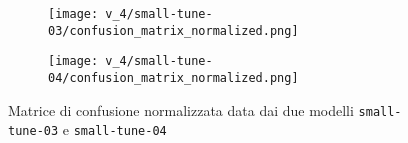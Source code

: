     \begin{figure}[!htb]
        \centering
        \begin{subfigure}{.49\textwidth}
            \texttt{[image: v\_4/small-tune-03/confusion\_matrix\_normalized.png]}
            \label{fig:v4-4.1}
        \end{subfigure}
        \begin{subfigure}{.49\textwidth}
            \texttt{[image: v\_4/small-tune-04/confusion\_matrix\_normalized.png]}
            \label{fig:v4-4.1}
        \end{subfigure}
        \caption{Matrice di confusione normalizzata data dai due modelli \texttt{small-tune-03} e \texttt{small-tune-04}}
        \label{fig:v4-4}
    \end{figure}


